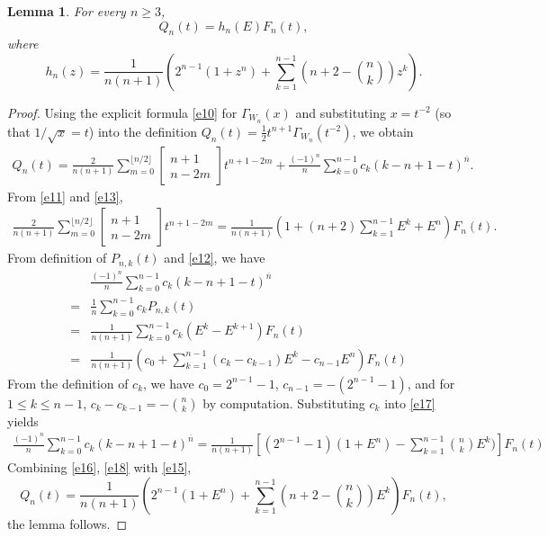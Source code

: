 \documentclass[12pt]{article}
\newtheorem{lemma}[theorem]{Lemma}
\theoremstyle{definition}
\begin{document}
\begin{lemma}\label{le:shift}
For every $n\geq 3$,
\[Q_n(t)=h_n(E)F_n(t),
\]
where
\[
h_n(z)=\frac{1}{n(n+1)}
\left(
2^{n-1}(1+z^n)+\sum_{k=1}^{n-1}\left(n+2-\binom{n}{k}\right)z^k
\right).
\]
\end{lemma}
\begin{proof}
Using the explicit formula \eqref{e10} for $\Gamma_{W_n}(x)$ and substituting \(x=t^{-2}\) (so that \(1/\sqrt{x}=t\)) into the definition \(Q_n(t)=\frac12 t^{n+1}\Gamma_{W_n}(t^{-2})\), we obtain
\begin{eqnarray}\label{e15}
Q_n(t)=\frac{2}{n(n+1)}
\sum_{m=0}^{\lfloor n/2\rfloor}
\begin{bmatrix}n+1\\ n-2m\end{bmatrix}t^{n+1-2m}
+\frac{(-1)^n}{n}\sum_{k=0}^{n-1}c_k(k-n+1-t)^{\overline{n}}.
\end{eqnarray}
From \eqref{e11} and \eqref{e13},
\begin{eqnarray}\label{e16}
\frac{2}{n(n+1)}\sum_{m=0}^{\lfloor n/2\rfloor}
\begin{bmatrix}n+1\\ n-2m\end{bmatrix}t^{n+1-2m}
=\frac{1}{n(n+1)} \left( 1 + (n + 2) \sum_{k=1}^{n-1} E^k + E^n \right) F_n(t).
\end{eqnarray}
From definition of $P_{n,k}(t)$ and \eqref{e12}, we have
\begin{eqnarray}\label{e17}
&&\frac{(-1)^n}{n}\sum_{k=0}^{n-1}c_k(k-n+1-t)^{\overline{n}}\nonumber\\
&=&\frac{1}{n}\sum_{k=0}^{n-1}c_kP_{n,k}(t)\nonumber\\
&=& \frac{1}{n(n+1)}\sum_{k=0}^{n-1}c_k(E^k-E^{k+1})F_n(t)\nonumber\\
&=&\frac{1}{n(n+1)}(c_0+\sum_{k=1}^{n-1}(c_k-c_{k-1})E^k-c_{n-1}E^n)F_{n}(t)
\end{eqnarray}
From the definition of \(c_k\), we have $c_0=2^{n-1}-1$, $c_{n-1}=-(2^{n-1}-1)$, and
for $1\leq k\leq n-1$, $c_k-c_{k-1}=-\binom{n}{k}$ by computation. Substituting $c_k$ into \eqref{e17} yields
\begin{eqnarray}\label{e18}
\frac{(-1)^n}{n}\sum_{k=0}^{n-1}c_k(k-n+1-t)^{\overline{n}}=\frac{1}{n(n+1)}[(2^{n-1}-1)(1+E^n)-\sum_{k=1}^{n-1}\binom{n}{k}E^k)]F_n(t)
\end{eqnarray}
Combining  \eqref{e16}, \eqref{e18} with \eqref{e15},
$$Q_n(t)=\frac{1}{n(n+1)}
\left(
2^{n-1}(1+E^n)+\sum_{k=1}^{n-1}\left(n+2-\binom{n}{k}\right)E^k
\right)F_n(t),$$
the lemma follows.
\end{proof}
\end{document}
